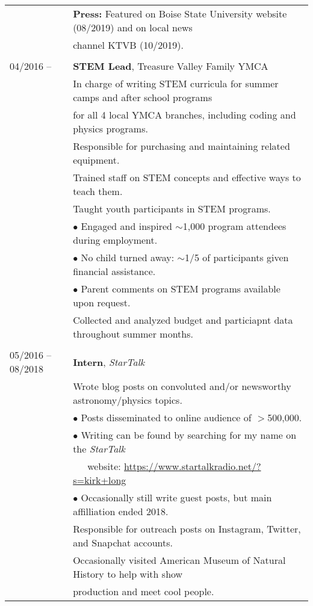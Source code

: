 \documentclass[11pt]{article}
\begin{document}
\begin{tabular}{ll}
      & \textbf{Press:} Featured on Boise State University website (08/2019) and on local news \\
      & channel KTVB (10/2019). \\
      & \\
04/2016 --    &   \textbf{STEM Lead}, Treasure Valley Family YMCA \vspace{1mm} \\
      & In charge of writing STEM curricula for summer camps and after school programs \\
      & for all 4 local YMCA branches, including coding and physics programs. \vspace{0.5mm}\\
      & Responsible for purchasing and maintaining related equipment. \vspace{0.5mm}\\
      & Trained staff on STEM concepts and effective ways to teach them. \vspace{0.5mm} \\
      & Taught youth participants in STEM programs. \\
      & $\bullet$ Engaged and inspired $\sim$1,000 program attendees during employment. \\
      & $\bullet$ No child turned away: $\sim$1/5 of participants given financial assistance. \\
      & $\bullet$ Parent comments on STEM programs available upon request. \vspace{1mm} \\
      & Collected and analyzed budget and particiapnt data throughout summer months. \\
      & \\
05/2016 -- 08/2018    &   \textbf{Intern}, \textit{StarTalk} \vspace{1mm} \\
      & Wrote blog posts on convoluted and/or newsworthy astronomy/physics topics. \\
      & $\bullet$ Posts disseminated to online audience of $>$500,000. \\
      & $\bullet$ Writing can be found by searching for my name on the \textit{StarTalk} \\
      & \-\ \-\ \-\ website: \url{https://www.startalkradio.net/?s=kirk+long} \\
      & $\bullet$ Occasionally still write guest posts, but main affilliation ended 2018. \vspace{1mm} \\
      & Responsible for outreach posts on Instagram, Twitter, and Snapchat accounts. \\
      & Occasionally visited American Museum of Natural History to help with show \\
      & production and meet cool people. \\

\end{tabular}
\end{document}
